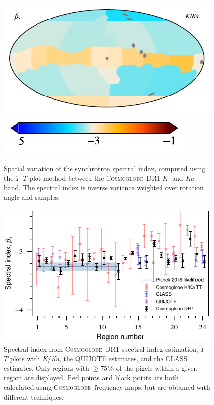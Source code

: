 \documentclass[twocolumn]{../../common/aa}
\newcommand{\cosmoglobe}{\textsc{Cosmoglobe}}
\newcommand{\Cosmoglobe}{\textsc{Cosmoglobe}}
\newcommand{\K}[0]{\textit K}
\newcommand{\Ka}[0]{\textit{Ka}}
\begin{document}
\begin{figure}
	\centering
	\includegraphics{figures/TT_map_CG_KKa.pdf}\vspace{-0.25cm}\\
	\hspace{0.25cm}\includegraphics{figures/cbar_beta_wide.pdf}
	\caption{Spatial variation of the synchrotron spectral index, computed using the $T$--$T$ plot method between the \Cosmoglobe\ DR1 \K- and \Ka-band. The spectral index is inverse variance weighted over rotation angle and samples.}
        \label{fig:beta_map}
\end{figure}

\begin{figure}
	\centering
	\includegraphics[width=\columnwidth]{figures/compare_betas.pdf}
	\caption{Spectral index from \cosmoglobe\ DR1 spectral index estimation, $T$--$T$ plots with \K/\Ka, the QUIJOTE estimates, and the CLASS estimates.
	Only regions with $\geq75\,\%$ of the pixels within a given region are displayed.
	Red points and black points are both calculated using \cosmoglobe\ frequency maps, but are obtained with different techniques.
	}
	\label{fig:beta_comp}
\end{figure}
\end{document}
